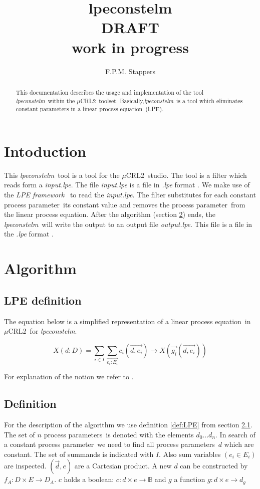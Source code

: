 \documentclass[a4paper,10pt]{article}
\title{lpeconstelm \\ DRAFT \\ work in progress}
\author{F.P.M. Stappers}
\newcommand{\lpe}{linear process equation}
\newcommand{\tool}{\textit{lpeconstelm}}
\newcommand{\ovr}{\overrightarrow}
\newcommand{\mcrl}{$\mu$CRL2}
\newcommand{\framework}{\textit{LPE framework} \cite{LPEframework}}
\newcommand{\pp}{process parameter}
\newcommand{\pps}{process parameters}
\newcommand{\ti}{\textit}
\begin{document}
\maketitle

\begin{abstract}
This documentation describes the usage and implementation of  the tool \tool\ within the \mcrl\ toolset.
Basically,\tool\ is a tool which eliminates constant parameters in a \lpe\ (LPE).
\end{abstract}

\tableofcontents

\section{Intoduction}
This \tool\ tool is a tool for the \mcrl\ studio. The tool is a
filter which reads form a \ti{input.lpe}. The file \ti{input.lpe} is
a file in \ti{.lpe} format \cite{LPEformat}. We make use of the
\framework\ to read the \ti{input.lpe}. The filter substitutes for
each constant \pp\ its constant value and removes the \pp\ from the
\lpe . After the algorithm (section \ref{sec:alg}) ends, the \tool\
will write the output to an output file \ti{output.lpe}. This file is
a file in the \ti{.lpe} format \cite{LPEformat}.

\section{Algorithm} \label{sec:alg}

\subsection{LPE definition}\label{sdef}
The equation below is a simplified representation of a \lpe\ in \mcrl\ for \tool . 
\begin{defn}\label{def:LPE}
\begin{displaymath}
X (d:D) = \sum_{i \in I} \sum_{\ovr{e_i:E_i}} c_i ( \ovr{d, e_i} ) \rightarrow X(\ovr{g_i}(\ovr{d,e_i}))
\end{displaymath}
\end{defn}
For explanation of the notion we refer to \cite{LPE_info}.

\subsection{Definition}
For the description of the algorithm we use definition \ref{def:LPE}
from section \ref{sdef}. The set of $n$ \pps\ is denoted with the
elements $d_0 \ldots d_n$. In search of a constant \pp\ we need to
find all \pps\ $d$ which are constant. The set of summands is
indicated with $I$. Also sum variables $(e_i \in E_i)$
are inspected. %
$(\ovr{d},e)$ are a Cartesian product. A new $d$ can be constructed by $f_A: D \times E \rightarrow D_A$.
$c$ holds a boolean: $c: d \times e \rightarrow \mathbb{B}$ and $g$ a function $g: d \times e \rightarrow d_g$
\end{document}
